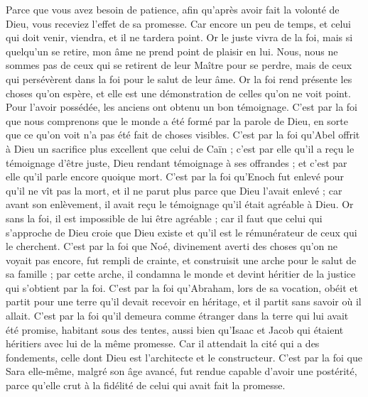 \begin{multicols}{2}
Parce que vous avez besoin de patience, afin qu’après avoir fait la volonté de Dieu, vous receviez l’effet de sa promesse.
Car encore un peu de temps, et celui qui doit venir, viendra, et il ne tardera point.
Or le juste vivra de la foi, mais si quelqu’un se retire, mon âme ne prend point de plaisir en lui.
Nous, nous ne sommes pas de ceux qui se retirent de leur Maître pour se perdre, mais de ceux qui persévèrent dans la foi pour le salut de leur âme.
\VerseOne{}Or la foi rend présente les choses qu'on espère, et elle est une démonstration de celles qu'on ne voit point.
Pour l’avoir possédée, les anciens ont obtenu un bon témoignage.
C’est par la foi que nous comprenons que le monde a été formé par la parole de Dieu, en sorte que ce qu’on voit n’a pas été fait de choses visibles.
C’est par la foi qu’Abel offrit à Dieu un sacrifice plus excellent que celui de Caïn ; c’est par elle qu’il a reçu le témoignage d’être juste, Dieu rendant témoignage à ses offrandes ; et c’est par elle qu’il parle encore quoique mort.
C’est par la foi qu’Enoch fut enlevé pour qu’il ne vît pas la mort, et il ne parut plus parce que Dieu l’avait enlevé ; car avant son enlèvement, il avait reçu le témoignage qu’il était agréable à Dieu.
Or sans la foi, il est impossible de lui être agréable ; car il faut que celui qui s’approche de Dieu croie que Dieu existe et qu'il est le rémunérateur de ceux qui le cherchent.
C’est par la foi que Noé, divinement averti des choses qu’on ne voyait pas encore, fut rempli de crainte, et construisit une arche pour le salut de sa famille ; par cette arche, il condamna le monde et devint héritier de la justice qui s’obtient par la foi.
C’est par la foi qu’Abraham, lors de sa vocation, obéit et partit pour une terre qu'il devait recevoir en héritage, et il partit sans savoir où il allait.
C’est par la foi qu’il demeura comme étranger dans la terre qui lui avait été promise, habitant sous des tentes, aussi bien qu’Isaac et Jacob qui étaient héritiers avec lui de la même promesse.
Car il attendait la cité qui a des fondements, celle dont Dieu est l'architecte et le constructeur.
C’est par la foi que Sara elle-même, malgré son âge avancé, fut rendue capable d’avoir une postérité, parce qu’elle crut à la fidélité de celui qui avait fait la promesse.

\end{multicols}
